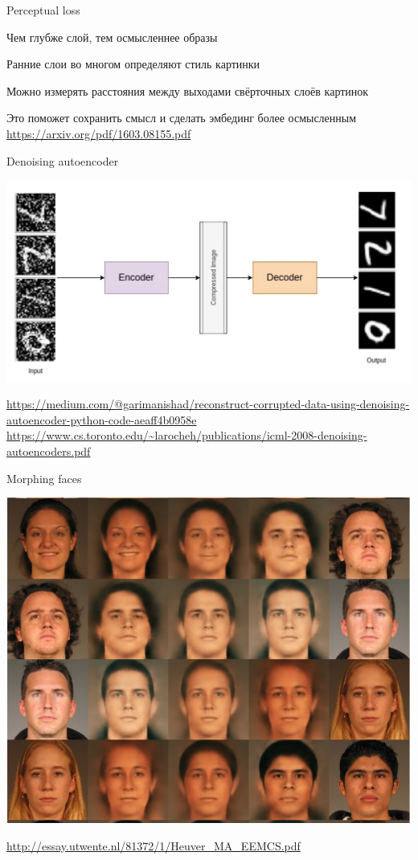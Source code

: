 \documentclass[notes,12pt, aspectratio=169]{beamer}
\newenvironment{wideitemize}{\itemize\addtolength{\itemsep}{10pt}}{\enditemize}
\begin{document}
\begin{frame}{Perceptual loss}
\begin{wideitemize}
	\item  Чем глубже слой, тем осмысленнее образы
	\item  Ранние слои во многом определяют стиль картинки
	\item  Можно измерять расстояния между выходами свёрточных слоёв картинок
	\item  Это поможет сохранить смысл и сделать эмбединг более осмысленным
\end{wideitemize}
	\vfill
\footnotesize
{\color{blue} \url{https://arxiv.org/pdf/1603.08155.pdf}} 
\end{frame}


\begin{frame}{Denoising autoencoder}
\begin{center}
	\includegraphics[width=.8\linewidth]{denoise.png}
\end{center}
\vfill
\footnotesize
{\color{blue} \url{https://medium.com/@garimanishad/reconstruct-corrupted-data-using-denoising-autoencoder-python-code-aeaff4b0958e} \newline \url{https://www.cs.toronto.edu/~larocheh/publications/icml-2008-denoising-autoencoders.pdf} } 
\end{frame}


\begin{frame}{Morphing faces}
\begin{center}
	\includegraphics[width=.5\linewidth]{morth.png}
\end{center}
\vfill
\footnotesize
{\color{blue} \url{http://essay.utwente.nl/81372/1/Heuver_MA_EEMCS.pdf}  } 
\end{frame}
\end{document}
